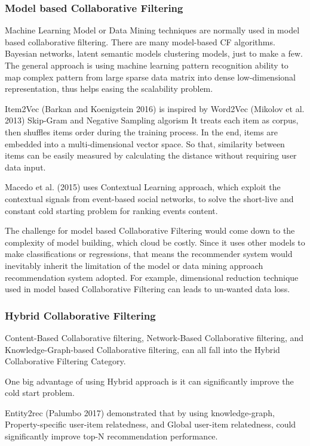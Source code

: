 \subsubsection{Model based Collaborative Filtering}

Machine Learning Model or Data Mining techniques are normally used in model based collaborative filtering. There are many model-based CF algorithms. Bayesian networks, latent semantic models clustering models, just to make a few. The general approach is using machine learning pattern recognition ability to map complex pattern from large sparse data matrix into dense low-dimensional representation, thus helps easing the scalability problem.  

Item2Vec (Barkan and Koenigstein 2016) is inspired by Word2Vec (Mikolov et al. 2013) Skip-Gram and Negative Sampling algorism It treats each item as corpus, then shuffles items order during the training process. In the end, items are embedded into a multi-dimensional vector space. So that, similarity between items can be easily measured by calculating the distance without requiring user data input.  

Macedo et al. (2015) uses Contextual Learning approach, which exploit the contextual signals from event-based social networks, to solve the short-live and constant cold starting problem for ranking events content. 

The challenge for model based Collaborative Filtering would come down to the complexity of model building, which cloud be costly.  Since it uses other models to make classifications or regressions, that means the recommender system would inevitably inherit the limitation of the model or data mining approach recommendation system adopted. For example, dimensional reduction technique used in model based Collaborative Filtering can leads to un-wanted data loss. 
 

\subsubsection{Hybrid Collaborative Filtering}

Content-Based Collaborative filtering, Network-Based Collaborative filtering, and Knowledge-Graph-based Collaborative filtering, can all fall into the Hybrid Collaborative Filtering Category.  

One big advantage of using Hybrid approach is it can significantly improve the cold start problem.  

Entity2rec (Palumbo 2017) demonstrated that by using knowledge-graph, Property-specific user-item relatedness, and Global user-item relatedness, could significantly improve top-N recommendation performance. 

